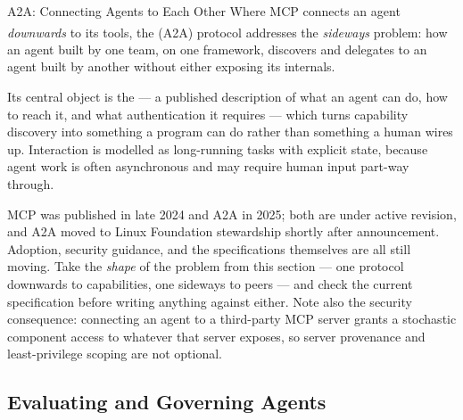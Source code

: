 \begin{v3topic}{A2A: Connecting Agents to Each Other}
    Where MCP connects an agent \emph{downwards} to its tools, the
    (A2A) protocol\textsuperscript{\cite{a2aAgent2AgentProtocol2026}}
    addresses the \emph{sideways} problem: how an agent built by one team, on
    one framework, discovers and delegates to an agent built by another
    without either exposing its internals.

    Its central object is the  --- a published description
    of what an agent can do, how to reach it, and what authentication it
    requires --- which turns capability discovery into something a program can
    do rather than something a human wires up. Interaction is modelled as
    long-running tasks with explicit state, because agent work is often
    asynchronous and may require human input part-way through.

\begin{cautionbox}
MCP was published in late 2024 and A2A in 2025; both are under active
revision, and A2A moved to Linux Foundation stewardship shortly after
announcement. Adoption, security guidance, and the specifications themselves
are all still moving. Take the \emph{shape} of the problem from this section
--- one protocol downwards to capabilities, one sideways to peers --- and check
the current specification before writing anything against either. Note also
the security consequence: connecting an agent to a third-party MCP server
grants a stochastic component access to whatever that server exposes, so
server provenance and least-privilege scoping are not optional.
\end{cautionbox}
\end{v3topic}

\subsection{Evaluating and Governing Agents}

